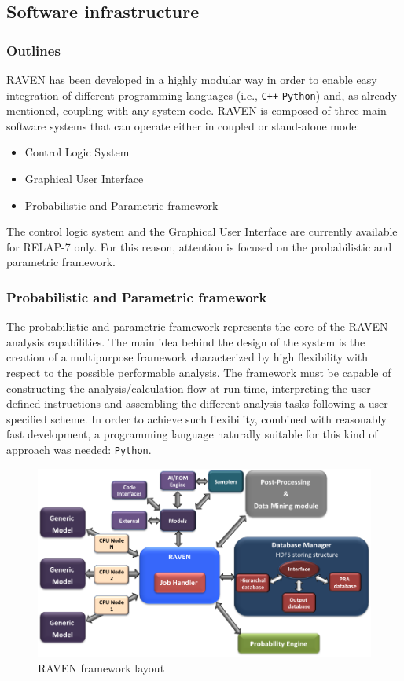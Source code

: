 \subsection{Software infrastructure}
\subsubsection{Outlines}
RAVEN has been developed in a highly modular way in order to enable easy integration of different programming languages (i.e., \texttt{C++} \texttt{Python}) and, as already mentioned, coupling with any system code.  
RAVEN is composed of three main software systems that can operate either in coupled or stand-alone mode:
\begin{itemize}
  \item Control Logic System
  \item Graphical User Interface
  \item Probabilistic and Parametric framework
\end{itemize}
The control logic system and the Graphical User Interface are currently available for RELAP-7 only. For this reason, attention is focused on the probabilistic and parametric framework.

\subsubsection{Probabilistic and Parametric framework}
The probabilistic and parametric framework represents the core of the RAVEN analysis capabilities. The main idea behind the design of the system is the creation of a multipurpose framework characterized by high flexibility with respect to the possible performable analysis. The framework must be capable of constructing the analysis/calculation flow at run-time, interpreting the user-defined instructions and assembling the different analysis tasks following a user specified scheme. 
In order to achieve such flexibility, combined with reasonably fast development, a programming language naturally suitable for this kind of approach was needed: \texttt{Python}.  

\begin{figure}[ht]
  \centering
  \includegraphics[width=1.0\textwidth]  {pics/RavenFramework.png}
  \caption{RAVEN framework layout}
  \label{fig:RAVENframeworkLayout}
\end{figure}

